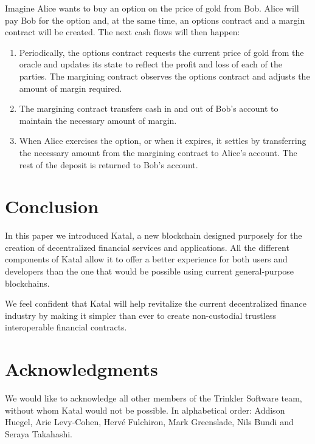 \documentclass[conference]{IEEEtran}
\begin{document}
Imagine Alice wants to buy an option on the price of gold from Bob. Alice will pay Bob for the option and, at the same time, an options contract and a margin contract will be created. The next cash flows will then happen:

\begin{enumerate}
	\item Periodically, the options contract requests the current price of gold from the oracle and updates its state to reflect the profit and loss of each of the parties. The margining contract observes the options contract and adjusts the amount of margin required.
	\item The margining contract transfers cash in and out of Bob's account to maintain the necessary amount of margin.
	\item When Alice exercises the option, or when it expires, it settles by transferring the necessary amount from the margining contract to Alice's account. The rest of the deposit is returned to Bob's account.
\end{enumerate}

\section{Conclusion}
In this paper we introduced Katal, a new blockchain designed purposely for the creation of decentralized financial services and applications. All the different components of Katal allow it to offer a better experience for both users and developers than the one that would be possible using current general-purpose blockchains.

We feel confident that Katal will help revitalize the current decentralized finance industry by making it simpler than ever to create non-custodial trustless interoperable financial contracts.

\section{Acknowledgments}

We would like to acknowledge all other members of the Trinkler Software team, without whom Katal would not be possible. In alphabetical order: Addison Huegel, Arie Levy-Cohen, Herv\'{e} Fulchiron, Mark Greenslade, Nils Bundi and Seraya Takahashi.



\end{document}
